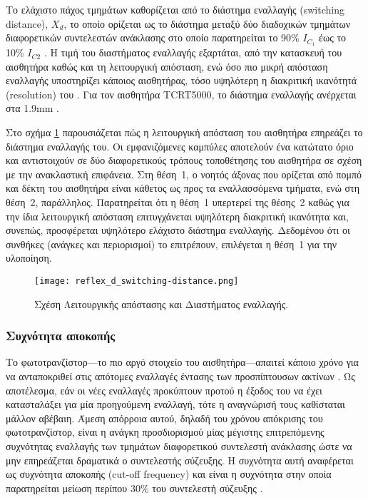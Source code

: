 Το ελάχιστο πάχος τμημάτων καθορίζεται από το διάστημα εναλλαγής (switching distance),
$X_d$, το οποίο ορίζεται ως το διάστημα μεταξύ δύο διαδοχικών τμημάτων
διαφορετικών συντελεστών ανάκλασης στο οποίο παρατηρείται το 90\% $I_{C_1}$ έως
το 10\% $I_{C2}$ \parencite{vishay06}. Η τιμή του διαστήματος εναλλαγής
εξαρτάται, από την κατασκευή του αισθητήρα καθώς και τη λειτουργική απόσταση,
ενώ όσο πιο μικρή απόσταση εναλλαγής υποστηρίζει κάποιος αισθητήρας, τόσο
υψηλότερη η διακριτική ικανότητά (resolution) του
\parencites{vishay02}{vishay06}. Για τον αισθητήρα TCRT5000, το διάστημα
εναλλαγής ανέρχεται στα 1.9mm \parencite{vishay02}.

Στο σχήμα \ref{fig:reflex:d_switching-distance} παρουσιάζεται πώς η λειτουργική
απόσταση του αισθητήρα επηρεάζει το διάστημα εναλλαγής του. Οι εμφανιζόμενες
καμπύλες αποτελούν ένα κατώτατο όριο και αντιστοιχούν σε δύο διαφορετικούς
τρόπους τοποθέτησης του αισθητήρα σε σχέση με την ανακλαστική επιφάνεια.
Στη θέση~1, ο νοητός άξονας που ορίζεται από πομπό και δέκτη του αισθητήρα είναι
κάθετος ως προς τα εναλλασσόμενα τμήματα, ενώ στη θέση~2, παράλληλος.
Παρατηρείται ότι η θέση~1 υπερτερεί της θέσης~2 καθώς για την ίδια λειτουργική
απόσταση επιτυγχάνεται υψηλότερη διακριτική ικανότητα και, συνεπώς, προσφέρεται
υψηλότερο ελάχιστο διάστημα εναλλαγής. Δεδομένου ότι οι συνθήκες (ανάγκες και
περιορισμοί) το επιτρέπουν, επιλέγεται η θέση~1 για την υλοποίηση.

\begin{figure}
    \caption{Σχέση Λειτουργικής απόστασης και Διαστήματος εναλλαγής.
    \label{fig:reflex:d_switching-distance}}
    \begin{center}%
    \texttt{[image: reflex\_d\_switching-distance.png]}%
    \end{center}

\end{figure}


\subsubsection{Συχνότητα αποκοπής}

Το φωτοτρανζίστορ---το πιο αργό στοιχείο του αισθητήρα---απαιτεί κάποιο χρόνο
για να ανταποκριθεί στις απότομες εναλλαγές έντασης των προσπίπτουσων ακτίνων
\parencite{vishay06}. Ως αποτέλεσμα, εάν οι νέες εναλλαγές προκύπτουν προτού η
έξοδος του να έχει κατασταλάξει για μία προηγούμενη εναλλαγή, τότε η αναγνώρισή
τους καθίσταται μάλλον αβέβαιη. Άμεση απόρροια αυτού, δηλαδή του χρόνου
απόκρισης του φωτοτρανζίστορ, είναι η ανάγκη προσδιορισμού μίας μέγιστης
επιτρεπόμενης συχνότητας εναλλαγής των τμημάτων διαφορετικού συντελεστή
ανάκλασης ώστε να μην επηρεάζεται δραματικά ο συντελεστής σύζευξης. Η συχνότητα
αυτή αναφέρεται ως συχνότητα αποκοπής 
(cut-off frequency) και είναι η συχνότητα στην οποία παρατηρείται μείωση
περίπου 30\% του συντελεστή σύζευξης \parencite{vishay02}.

